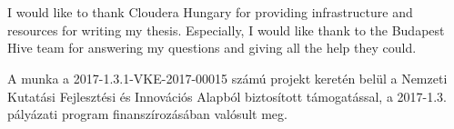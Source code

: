 \chapter*{\koszonetnyilvanitas}

I would like to thank Cloudera Hungary for providing infrastructure and resources for writing my thesis. Especially, I would like thank to the Budapest Hive team for answering my questions and giving all the help they could.

A munka a 2017-1.3.1-VKE-2017-00015 számú projekt keretén belül a Nemzeti Kutatási Fejlesztési és Innovációs Alapból biztosított támogatással, a 2017-1.3. pályázati program finanszírozásában valósult meg.